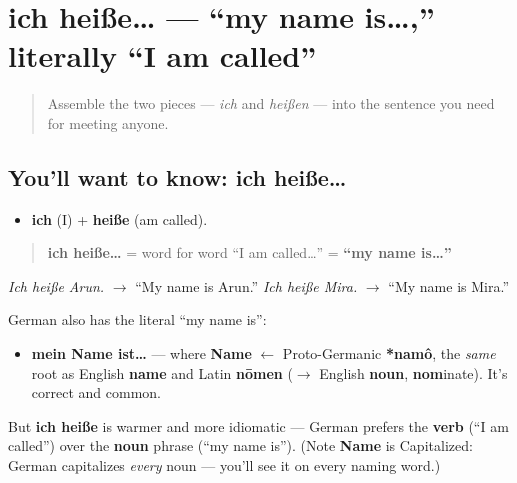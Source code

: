 \section[ich heiße…]{ich heiße… — \textquotedblleft{}my name is…,\textquotedblright{} literally \textquotedblleft{}I am called\textquotedblright{}}

\label{lesson:GE-C02-ich-heisse}



\begin{quote}
Assemble the two pieces — \emph{ich} and \emph{heißen} — into the sentence you need for meeting anyone.
\end{quote}

\subsection*{You'll want to know: ich heiße…}
\begin{itemize}
\raggedright
  \item \textbf{ich} (I) + \textbf{heiße} (am called).
\end{itemize}

\begin{quote}
\textbf{ich heiße…} = word for word \textquotedblleft{}I am called…\textquotedblright{} = \textbf{\textquotedblleft{}my name is…\textquotedblright{}}
\end{quote}

\emph{Ich heiße Arun.} $\to$ \textquotedblleft{}My name is Arun.\textquotedblright{} \emph{Ich heiße Mira.} $\to$ \textquotedblleft{}My name is Mira.\textquotedblright{}

\begin{culture}
German also has the literal \textquotedblleft{}my name is\textquotedblright{}:

\begin{itemize}
\raggedright
  \item \textbf{mein Name ist…} — where \textbf{Name} $\leftarrow$ Proto-Germanic \textbf{*namô}, the \emph{same} root as English \textbf{name} and Latin \textbf{nōmen} ($\to$ English \textbf{noun}, \textbf{nom}inate). It's correct and common.
\end{itemize}

But \textbf{ich heiße} is warmer and more idiomatic — German prefers the \textbf{verb} (\textquotedblleft{}I am called\textquotedblright{}) over the \textbf{noun} phrase (\textquotedblleft{}my name is\textquotedblright{}). (Note \textbf{Name} is Capitalized: German capitalizes \emph{every} noun — you'll see it on every naming word.)
\end{culture}

